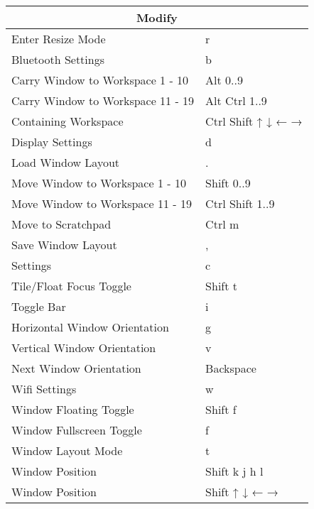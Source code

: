 \documentclass[12pt,paper=landscape,paper=a4]{scrartcl}
\begin{document}
\begin{multicols}{2}
    \begin{tabular}{ll}
         \multicolumn{2}{c}{Modify}\\
         \hline
         Enter Resize Mode                  & \faWindows{} r\\
         Bluetooth Settings                 & \faWindows{} b\\
         Carry Window to Workspace 1 - 10   & \faWindows{} Alt 0..9\\
         Carry Window to Workspace 11 - 19  & \faWindows{} Alt Ctrl 1..9\\
         Containing Workspace               & \faWindows{} Ctrl Shift ↑ ↓ ← →\\
         Display Settings                   & \faWindows{} d\\
         Load Window Layout                 & \faWindows{} .\\
         Move Window to Workspace 1 - 10    & \faWindows{} Shift 0..9\\
         Move Window to Workspace 11 - 19   & \faWindows{} Ctrl Shift 1..9\\
         Move to Scratchpad                 & \faWindows{} Ctrl m\\
         Save Window Layout                 & \faWindows{} ,\\
         Settings                           & \faWindows{} c\\
         Tile/Float Focus Toggle            & \faWindows{} Shift t\\
         Toggle Bar                         & \faWindows{} i\\
         Horizontal Window Orientation      & \faWindows{} g\\
         Vertical Window Orientation        & \faWindows{} v\\
         Next Window Orientation            & \faWindows{} Backspace\\
         Wifi Settings                      & \faWindows{} w\\
         Window Floating Toggle             & \faWindows{} Shift f\\
         Window Fullscreen Toggle           & \faWindows{} f\\
         Window Layout Mode                 & \faWindows{} t\\
         Window Position                    & \faWindows{} Shift k j h l\\
         Window Position                    & \faWindows{} Shift ↑ ↓ ← →
     \end{tabular}


\end{multicols}
\end{document}
